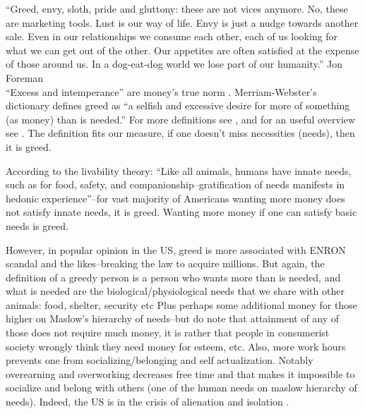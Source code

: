 \documentclass[10pt, letterpaper]{article}
\begin{document}
\begin{spacing}{1.8}
\noindent``Greed, envy, sloth, pride and gluttony: these are not vices anymore. No, these are marketing tools. Lust is our way of life. Envy is just a nudge towards another sale. Even in our relationships we consume each other, each of us looking for what we can get out of the other. Our appetites are often satisfied at the expense of those around us. In a dog-eat-dog world we lose part of our humanity.'' Jon Foreman\\




``Excess and intemperance'' are money's true norm \citep{marx1844-human-requirements}.
Merriam-Webster's dictionary defines greed as ``a selfish and
excessive desire for more of something (as money) than is needed.'' For more
definitions see \citet{seuntjens15b}, and for an useful overview see \citet{wang11b}. 
 The definition fits our measure, if one doesn't miss necessities (needs), then it is
 greed.

 According to the  livability theory:
 ``Like all animals, humans have innate needs, such as for food, safety, and
 companionship--gratification of needs manifests in hedonic
 experience''\citep{veenhoven14b}--for vast majority of Americans wanting more
 money does not satisfy innate needs, it is greed. Wanting more money if one can
 satisfy basic needs is greed.


However, in popular opinion in the US, greed is more associated  with ENRON scandal and the likes--breaking
the law to acquire millions. But again,  the definition of a
greedy person is a person who wants more than is needed, and what is needed
are the biological/physiological needs that we share with other animals: food,
shelter, security etc \citep{veenhoven14b}
%
{Plus perhaps some additional money for those higher on
  Maslow's hierarchy of needs--but do note that attainment of any of those does
  not require much money, it is rather that people in consumerist society
  wrongly think they need money for esteem, etc. Also, more work hours prevents 
  one from socializing/belonging and self actualization.}
%
Notably overearning and overworking decreases free time and that makes it
impossible to socialize and belong with others (one of the human needs on maslow
hierarchy of needs). Indeed, the US is in the crisis of alienation and isolation \citep{putnam01,wilkinson09}.


\end{spacing}
\end{document}
